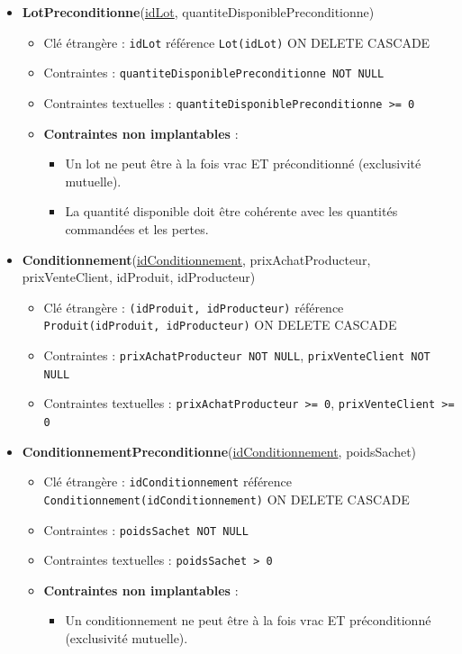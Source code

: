 \begin{itemize}
    \item \textbf{LotPreconditionne}(\underline{idLot}, quantiteDisponiblePreconditionne)
    \begin{itemize}
        \item Clé étrangère : \texttt{idLot} référence \texttt{Lot(idLot)} ON DELETE CASCADE
        \item Contraintes : \texttt{quantiteDisponiblePreconditionne NOT NULL}
        \item Contraintes textuelles : \texttt{quantiteDisponiblePreconditionne >= 0}
        \item \textbf{Contraintes non implantables} :
        \begin{itemize}
            \item Un lot ne peut être à la fois vrac ET préconditionné (exclusivité mutuelle).
            \item La quantité disponible doit être cohérente avec les quantités commandées et les pertes.
        \end{itemize}
    \end{itemize}
    
    \item \textbf{Conditionnement}(\underline{idConditionnement}, prixAchatProducteur, prixVenteClient, idProduit, idProducteur)
    \begin{itemize}
        \item Clé étrangère : \texttt{(idProduit, idProducteur)} référence \texttt{Produit(idProduit, idProducteur)} ON DELETE CASCADE
        \item Contraintes : \texttt{prixAchatProducteur NOT NULL}, \texttt{prixVenteClient NOT NULL}
        \item Contraintes textuelles : \texttt{prixAchatProducteur >= 0}, \texttt{prixVenteClient >= 0}
    \end{itemize}
    
    \item \textbf{ConditionnementPreconditionne}(\underline{idConditionnement}, poidsSachet)
    \begin{itemize}
        \item Clé étrangère : \texttt{idConditionnement} référence \texttt{Conditionnement(idConditionnement)} ON DELETE CASCADE
        \item Contraintes : \texttt{poidsSachet NOT NULL}
        \item Contraintes textuelles : \texttt{poidsSachet > 0}
        \item \textbf{Contraintes non implantables} :
        \begin{itemize}
            \item Un conditionnement ne peut être à la fois vrac ET préconditionné (exclusivité mutuelle).
        \end{itemize}
    \end{itemize}
    

\end{itemize}
